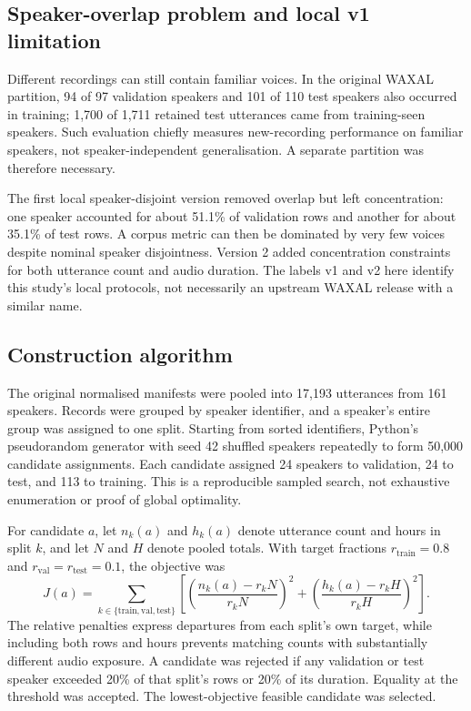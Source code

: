 \documentclass[12pt,a4paper]{report}
\begin{document}
\subsection{Speaker-overlap problem and local v1 limitation}

Different recordings can still contain familiar voices. In the original WAXAL partition, 94 of 97 validation speakers and 101 of 110 test speakers also occurred in training; 1,700 of 1,711 retained test utterances came from training-seen speakers. Such evaluation chiefly measures new-recording performance on familiar speakers, not speaker-independent generalisation. A separate partition was therefore necessary.

The first local speaker-disjoint version removed overlap but left concentration: one speaker accounted for about 51.1\% of validation rows and another for about 35.1\% of test rows. A corpus metric can then be dominated by very few voices despite nominal speaker disjointness. Version 2 added concentration constraints for both utterance count and audio duration. The labels v1 and v2 here identify this study's local protocols, not necessarily an upstream WAXAL release with a similar name.

\subsection{Construction algorithm}

The original normalised manifests were pooled into 17,193 utterances from 161 speakers. Records were grouped by speaker identifier, and a speaker's entire group was assigned to one split. Starting from sorted identifiers, Python's pseudorandom generator with seed 42 shuffled speakers repeatedly to form 50,000 candidate assignments. Each candidate assigned 24 speakers to validation, 24 to test, and 113 to training. This is a reproducible sampled search, not exhaustive enumeration or proof of global optimality.

For candidate $a$, let $n_k(a)$ and $h_k(a)$ denote utterance count and hours in split $k$, and let $N$ and $H$ denote pooled totals. With target fractions $r_{\mathrm{train}}=0.8$ and $r_{\mathrm{val}}=r_{\mathrm{test}}=0.1$, the objective was
\begin{equation}
J(a)=\sum_{k\in\{\mathrm{train},\mathrm{val},\mathrm{test}\}}
\left[\left(\frac{n_k(a)-r_kN}{r_kN}\right)^2+
\left(\frac{h_k(a)-r_kH}{r_kH}\right)^2\right].
\end{equation}
The relative penalties express departures from each split's own target, while including both rows and hours prevents matching counts with substantially different audio exposure. A candidate was rejected if any validation or test speaker exceeded 20\% of that split's rows or 20\% of its duration. Equality at the threshold was accepted. The lowest-objective feasible candidate was selected.
\end{document}
